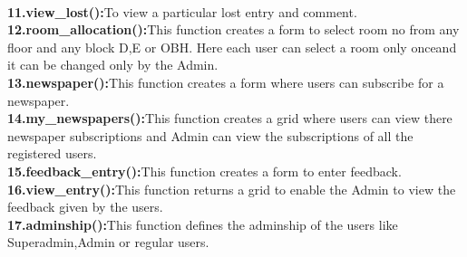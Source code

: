 \documentclass[a4paper,11pt]{article}
\begin{document}
\newline
\\
{\bfseries 11.view\_lost():}To view a particular lost entry and comment.
\newline
\\
{\bfseries 12.room\_allocation():}This function creates a form to select room no from any floor and any block D,E or OBH. Here each user can select a room only onceand it can be changed only by the Admin.
\newline
\\
{\bfseries 13.newspaper():}This function creates a form where users can subscribe for a newspaper.
\newline
\\
{\bfseries 14.my\_newspapers():}This function creates a grid where users can view there newspaper subscriptions and Admin can view the subscriptions of all the registered users.
\newline
\\
{\bfseries 15.feedback\_entry():}This function creates a form to enter feedback.
\newline
\\
{\bfseries 16.view\_entry():}This function returns a grid to enable the Admin to view the feedback given by the users.
\newline
\\
{\bfseries 17.adminship():}This function defines the adminship of the users like Superadmin,Admin or regular users.

\newpage
\end{document}
